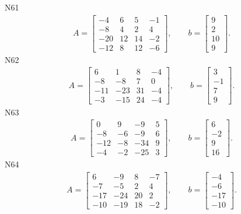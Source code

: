 \documentclass[11pt]{report}
\begin{document}
N61
\begin{align*}
 A = \left[\begin{matrix}-4 & 6 & 5 & -1\\-8 & 4 & 2 & 4\\-20 & 12 & 14 & -2\\-12 & 8 & 12 & -6\end{matrix}\right],
\qquad b = \left[\begin{matrix}9\\2\\10\\9\end{matrix}\right]. 
 \end{align*}
N62
\begin{align*}
 A = \left[\begin{matrix}6 & 1 & 8 & -4\\-8 & -8 & 7 & 0\\-11 & -23 & 31 & -4\\-3 & -15 & 24 & -4\end{matrix}\right],
\qquad b = \left[\begin{matrix}3\\-1\\7\\9\end{matrix}\right]. 
 \end{align*}
N63
\begin{align*}
 A = \left[\begin{matrix}0 & 9 & -9 & 5\\-8 & -6 & -9 & 6\\-12 & -8 & -34 & 9\\-4 & -2 & -25 & 3\end{matrix}\right],
\qquad b = \left[\begin{matrix}6\\-2\\9\\16\end{matrix}\right]. 
 \end{align*}
N64
\begin{align*}
 A = \left[\begin{matrix}6 & -9 & 8 & -7\\-7 & -5 & 2 & 4\\-17 & -24 & 20 & 2\\-10 & -19 & 18 & -2\end{matrix}\right],
\qquad b = \left[\begin{matrix}-4\\-6\\-17\\-10\end{matrix}\right]. 
 \end{align*}
\end{document}
